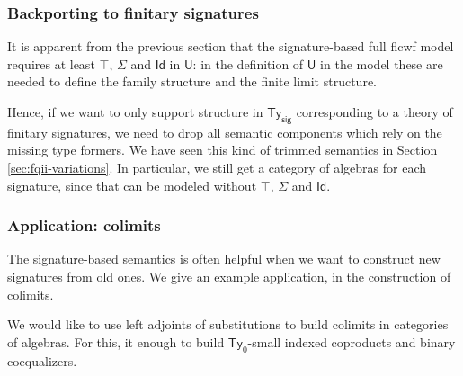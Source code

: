 \documentclass[12pt,a4paper,twoside,openany]{book}
\theoremstyle{remark}
\theoremstyle{definition}
\theoremstyle{theorem}
\newcommand{\ms}[1]{\mathsf{#1}}
\newcommand{\bs}[1]{\boldsymbol{#1}}
\newcommand{\Tys}{\ms{Ty_{sig}}}
\newcommand{\Ty}{\mathsf{Ty}}
\newcommand{\U}{\mathsf{U}}
\newcommand{\Id}{\mathsf{Id}}
\newcommand{\bU}{\bs{\U}}
\begin{document}
\subsubsection{Backporting to finitary signatures}

It is apparent from the previous section that the signature-based full flcwf
model requires at least $\top$, $\Sigma$ and $\Id$ in $\U$: in the definition of
$\bU$ in the model these are needed to define the family structure and the
finite limit structure.

Hence, if we want to only support structure in $\Tys$ corresponding to a theory
of finitary signatures, we need to drop all semantic components which rely on
the missing type formers. We have seen this kind of trimmed semantics in Section
\ref{sec:fqii-variations}. In particular, we still get a category of algebras
for each signature, since that can be modeled without $\top$, $\Sigma$ and
$\Id$.

\subsubsection{Application: colimits}

The signature-based semantics is often helpful when we want to construct new
signatures from old ones. We give an example application, in the construction of
colimits.

We would like to use left adjoints of substitutions to build colimits in
categories of algebras. For this, it enough to build $\Ty_0$-small indexed
coproducts and binary coequalizers.
\end{document}
